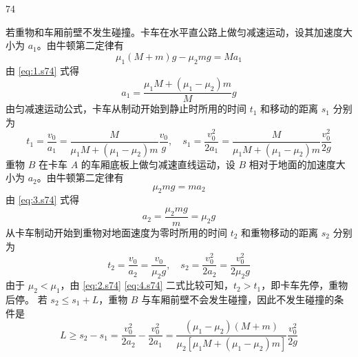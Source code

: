 \begin{solution}{74}
    \begin{subsolution}
        若重物和车厢前壁不发生碰撞。卡车在水平直公路上做匀减速运动，设其加速度大小为 $a_{1}$。由牛顿第二定律有
        \begin{equation}
            \mu_{1} (M + m) g - \mu_{2} m g = M a_{1}
            \label{eq:1.s74}
        \end{equation}
        由 \eqref{eq:1.s74} 式得
        \begin{equation}
            a_{1} = \frac{\mu_{1} M + (\mu_{1} - \mu_{2}) m}{M} g
        \end{equation}
        由匀减速运动公式，卡车从制动开始到静止时所用的时间 $t_{1}$ 和移动的距离 $s_{1}$ 分别为
        \begin{equation}
            t_{1} = \frac{v_{0}}{a_{1}} = \frac{M}{\mu_{1} M + (\mu_{1} - \mu_{2}) m} \frac{v_{0}}{g},\quad 
            s_{1} = \frac{v_{0}^{2}}{2 a_{1}} = \frac{M}{\mu_{1} M + (\mu_{1} - \mu_{2}) m} \frac{v_{0}^{2}}{2 g}
            \label{eq:2.s74}
        \end{equation}
        重物 $B$ 在卡车 $A$ 的车厢底板上做匀减速直线运动，设 $B$ 相对于地面的加速度大小为 $a_{2}$。由牛顿第二定律有
        \begin{equation}
            \mu_{2} m g = m a_{2}
            \label{eq:3.s74}
        \end{equation}
        由 \eqref{eq:3.s74} 式得
        \begin{equation}
            a_{2} = \frac{\mu_{2} m g}{m} = \mu_{2} g
        \end{equation}
        从卡车制动开始到重物对地面速度为零时所用的时间 $t_{2}$ 和重物移动的距离 $s_{2}$ 分别为
        \begin{equation}
            t_{2} = \frac{v_{0}}{a_{2}} = \frac{v_{0}}{\mu_{2} g},\quad 
            s_{2} = \frac{v_{0}^{2}}{2 a_{2}} = \frac{v_{0}^{2}}{2 \mu_{2} g}
            \label{eq:4.s74}
        \end{equation}
        由于 $\mu_{2}<\mu_{1}$，由 \eqref{eq:2.s74} \eqref{eq:4.s74} 二式比较可知，$t_{2}>t_{1}$，即卡车先停，重物后停。
        若 $s_{2} \leq s_{1} + L$，重物 $B$ 与车厢前壁不会发生碰撞，因此不发生碰撞的条件是
        \begin{equation}
            L \geq s_{2} - s_{1} = \frac{v_{0}^{2}}{2 a_{2}} - \frac{v_{0}^{2}}{2 a_{1}} = \frac{(\mu_{1} - \mu_{2})(M + m)}{\mu_{2} [\mu_{1} M + (\mu_{1} - \mu_{2}) m]} \frac{v_{0}^{2}}{2 g}
            \label{eq:5.s74}
        \end{equation}

\end{subsolution}
\end{solution}
